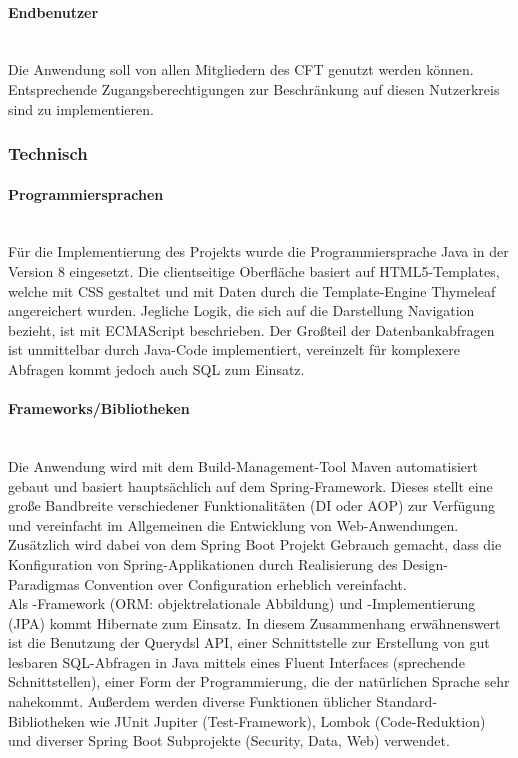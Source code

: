 \paragraph{Endbenutzer}~\\\label{p:Endbenutzer}
Die Anwendung \projektName soll von allen Mitgliedern des \ac{CFT} \teamName genutzt werden können. Entsprechende Zugangsberechtigungen zur Beschränkung auf diesen Nutzerkreis sind zu implementieren.

\subsubsection{Technisch}\label{sec:Projektschnittstellen:Technisch}

\paragraph{Programmiersprachen}~\\\label{p:Programmiersprachen}
Für die Implementierung des Projekts wurde die Programmiersprache Java in der Version 8 eingesetzt. Die clientseitige Oberfläche basiert auf HTML5-Templates, welche mit CSS gestaltet und mit Daten durch die Template-Engine Thymeleaf angereichert wurden. Jegliche Logik, die sich auf die Darstellung \bzw Navigation bezieht, ist mit ECMAScript beschrieben. Der Großteil der Datenbankabfragen ist unmittelbar durch Java-Code implementiert, vereinzelt für komplexere Abfragen kommt jedoch auch SQL zum Einsatz.

\paragraph{Frameworks/Bibliotheken}~\\\label{p:Frameworks}
Die Anwendung wird mit dem Build-Management-Tool Maven automatisiert gebaut und basiert hauptsächlich auf dem Spring-Framework. Dieses stellt eine große Bandbreite verschiedener Funktionalitäten (\zB \ac{DI} oder \ac{AOP}) zur Verfügung und vereinfacht im Allgemeinen die Entwicklung von Web-Anwendungen.\\
Zusätzlich wird dabei von dem Spring Boot Projekt Gebrauch gemacht, dass die Konfiguration von Spring-Applikationen durch Realisierung des Design-Paradigmas Convention over Configuration erheblich vereinfacht.\\
Als -Framework (\ac{ORM}: objektrelationale Abbildung) und -Implementierung (\ac{JPA}) kommt Hibernate zum Einsatz. In diesem Zusammenhang erwähnenswert ist die Benutzung der Querydsl API, einer Schnittstelle zur Erstellung von gut lesbaren SQL-Abfragen in Java mittels eines Fluent Interfaces (sprechende Schnittstellen), einer Form der Programmierung, die der natürlichen Sprache sehr nahekommt.
Außerdem werden diverse Funktionen üblicher Standard-Bibliotheken wie JUnit Jupiter (Test-Framework), Lombok (Code-Reduktion) und diverser Spring Boot Subprojekte (Security, Data, Web) verwendet.



